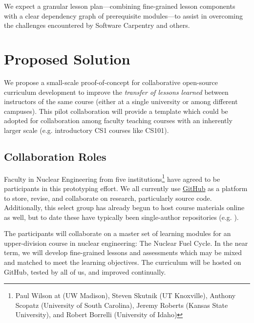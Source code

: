 \documentclass[11pt]{article}
\begin{document}
          We expect a granular lesson plan---combining fine-grained lesson components
          with a clear dependency graph of prerequisite modules---to assist in 
          overcoming the challenges encountered by Software Carpentry and 
          others.

          \section{Proposed Solution}
          We propose a small-scale proof-of-concept for collaborative
          open-source curriculum development to improve the \emph{transfer of lessons 
          learned} between instructors of the same course (either at a single 
          university or among different campuses). This pilot collaboration 
          will provide a template which could be adopted for collaboration 
          among faculty teaching courses with an inherently larger scale (e.g. 
          introductory CS1 courses like CS101).

          \subsection{Collaboration Roles}
          Faculty in Nuclear Engineering from five institutions\footnote{
          Paul Wilson at (UW Madison), 
          Steven Skutnik (UT Knoxville), 
          Anthony Scopatz (University of South Carolina), 
          Jeremy Roberts (Kansas State University), 
          and Robert Borrelli (University of Idaho)
          } have agreed to be participants in 
          this prototyping effort. We all currently use 
          \href{https://github.com}{GitHub} as a platform to store, 
          revise, and collaborate on research, particularly source code. 
          Additionally, this select group has already begun to host course 
          materials online as well, but to date these have typically been single-author 
          repositories (e.g. \cite{huff_npre412_2017}).

          The participants will collaborate on a master set of learning 
          modules for an upper-division course in nuclear engineering: 
          The Nuclear Fuel Cycle. In the near term, we will develop 
          fine-grained lessons and assessments which may be mixed and matched 
          to meet the learning objectives. The curriculum will be hosted on 
          GitHub, tested by all of us, and improved continually.
          
\end{document}
